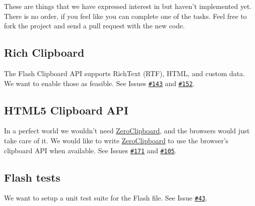 These are things that we have expressed interest in but haven't implemented yet. There is no order, if you feel like you can complete one of the tasks. Feel free to fork the project and send a pull request with the new code.

\subsection*{Rich Clipboard}

The Flash Clipboard A\-P\-I supports Rich\-Text (R\-T\-F), H\-T\-M\-L, and custom data. We want to enable those as feasible. See Issues \href{https://github.com/zeroclipboard/zeroclipboard/issues/143}{\tt \#143} and \href{https://github.com/zeroclipboard/zeroclipboard/issues/152}{\tt \#152}.

\subsection*{H\-T\-M\-L5 Clipboard A\-P\-I}

In a perfect world we wouldn't need \hyperlink{class_zero_clipboard}{Zero\-Clipboard}, and the browsers would just take care of it. We would like to write \hyperlink{class_zero_clipboard}{Zero\-Clipboard} to use the browser's clipboard A\-P\-I when available. See Issues \href{https://github.com/zeroclipboard/zeroclipboard/issues/171}{\tt \#171} and \href{https://github.com/zeroclipboard/zeroclipboard/issues/105}{\tt \#105}.

\subsection*{Flash tests}

We want to setup a unit test suite for the Flash file. See Issue \href{https://github.com/zeroclipboard/zeroclipboard/issues/43}{\tt \#43}. 